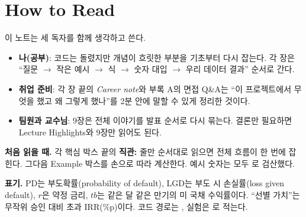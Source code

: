 \chapter*{How to Read}

이 노트는 세 독자를 함께 생각하고 쓴다.
\begin{itemize}[leftmargin=*]
\item \textbf{나(공부)}: 코드는 돌렸지만 개념이 흐릿한 부분을 기초부터 다시 잡는다. 각 장은 ``질문 \ensuremath{\to} 작은 예시 \ensuremath{\to} 식 \ensuremath{\to} 숫자 대입 \ensuremath{\to} 우리 데이터 결과'' 순서로 간다.
\item \textbf{취업 준비}: 각 장 끝의 \textit{Career note}와 부록 A의 면접 Q\&A는 ``이 프로젝트에서 무엇을 했고 왜 그렇게 했나''를 2분 안에 말할 수 있게 정리한 것이다.
\item \textbf{팀원과 교수님}: 9장은 전체 이야기를 발표 순서로 다시 묶는다. 결론만 필요하면 Lecture Highlights와 9장만 읽어도 된다.
\end{itemize}

\textbf{처음 읽을 때.} 각 핵심 박스 끝의 \textbf{직관:} 줄만 순서대로 읽으면 전체 흐름이 한 번에 잡힌다. 그다음 Example 박스를 손으로 따라 계산한다. 예시 숫자는 모두 로 검산했다.

\textbf{표기.} PD는 부도확률(probability of default), LGD는 부도 시 손실률(loss given default), $r$은 약정 금리, $tb$는 같은 달 같은 만기의 미 국채 수익률이다. ``선별 가치''는 무작위 승인 대비 초과 IRR(\%p)이다. 코드 경로는 , 실험은 로 적는다.

